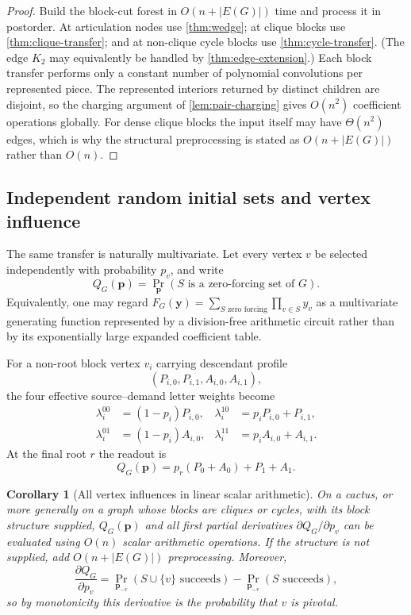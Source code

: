 \documentclass[11pt,reqno]{amsart}
\newtheorem{corollary}[corollary]{Corollary}
\theoremstyle{definition}
\begin{document}
\begin{proof}
Build the block-cut forest in $O(n+|E(G)|)$ time and process it in postorder.
At articulation nodes use \cref{thm:wedge}; at clique blocks use
\cref{thm:clique-transfer}; and at non-clique cycle blocks use
\cref{thm:cycle-transfer}.  (The edge $K_2$ may equivalently be handled by
\cref{thm:edge-extension}.)  Each block transfer performs only a constant
number of polynomial convolutions per represented piece.  The represented
interiors returned by distinct children are disjoint, so the charging argument
of \cref{lem:pair-charging} gives $O(n^2)$ coefficient operations globally.
For dense clique blocks the input itself may have $\Theta(n^2)$ edges, which is
why the structural preprocessing is stated as $O(n+|E(G)|)$ rather than
$O(n)$.
\end{proof}

\subsection{Independent random initial sets and vertex influence}\label{subsec:influence}

The same transfer is naturally multivariate.  Let every vertex $v$ be selected
independently with probability $p_v$, and write
\[
 Q_G(\mathbf p)=\Pr_{\mathbf p}(S\text{ is a zero-forcing set of }G).
\]
Equivalently, one may regard
$F_G(\mathbf y)=\sum_{S\text{ zero forcing}}\prod_{v\in S}y_v$ as a
multivariate generating function represented by a division-free arithmetic
circuit rather than by its exponentially large expanded coefficient table.

For a non-root block vertex $v_i$ carrying descendant profile
\[
 (P_{i,0},P_{i,1},A_{i,0},A_{i,1}),
\]
the four effective source--demand letter weights become
\begin{align}
 \lambda_i^{00}&=(1-p_i)P_{i,0}, &
 \lambda_i^{10}&=p_iP_{i,0}+P_{i,1},\label{eq:prob-letters-a}\\
 \lambda_i^{01}&=(1-p_i)A_{i,0}, &
 \lambda_i^{11}&=p_iA_{i,0}+A_{i,1}.\label{eq:prob-letters-b}
\end{align}
At the final root $r$ the readout is
\begin{equation}\label{eq:prob-readout}
 Q_G(\mathbf p)=p_r(P_0+A_0)+P_1+A_1.
\end{equation}

\begin{corollary}[All vertex influences in linear scalar arithmetic]
\label{cor:influences}
On a cactus, or more generally on a graph whose blocks are cliques or cycles,
with its block structure supplied, $Q_G(\mathbf p)$ and all first partial
derivatives $\partial Q_G/\partial p_v$ can be evaluated using $O(n)$ scalar
arithmetic operations.  If the structure is not supplied, add
$O(n+|E(G)|)$ preprocessing.
Moreover,
\[
 \frac{\partial Q_G}{\partial p_v}
 =\Pr_{\mathbf p_{-v}}(S\cup\{v\}\text{ succeeds})
  -\Pr_{\mathbf p_{-v}}(S\text{ succeeds}),
\]
so by monotonicity this derivative is the probability that $v$ is pivotal.
\end{corollary}
\end{document}
